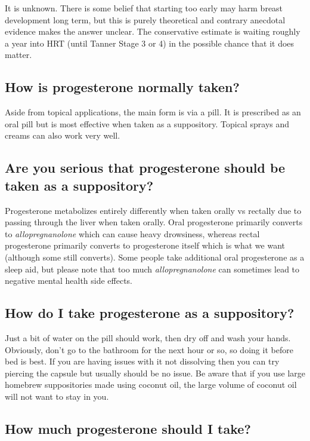 \documentclass{article}
\begin{document}
It is unknown. There is some belief that starting too early may harm breast development long term, but this is purely theoretical and contrary anecdotal evidence makes the answer unclear. The conservative estimate is waiting roughly a year into HRT (until Tanner Stage 3 or 4) in the possible chance that it does matter.

\subsection{How is progesterone normally taken?}

Aside from topical applications, the main form is via a pill. It is prescribed as an oral pill but is most effective when taken as a suppository. Topical sprays and creams can also work very well.

\subsection{Are you serious that progesterone should be taken as a suppository?}

Progesterone metabolizes entirely differently when taken orally vs rectally due to passing through the liver when taken orally. Oral progesterone primarily converts to \textit{allopregnanolone} which can cause heavy drowsiness, whereas rectal progesterone primarily converts to progesterone itself which is what we want (although some still converts). Some people take additional oral progesterone as a sleep aid, but please note that too much \textit{allopregnanolone} can sometimes lead to negative mental health side effects.

\subsection{How do I take progesterone as a suppository?}

Just a bit of water on the pill should work, then dry off and wash your hands. Obviously, don’t go to the bathroom for the next hour or so, so doing it before bed is best. If you are having issues with it not dissolving then you can try piercing the capsule but usually should be no issue. Be aware that if you use large homebrew suppositories made using coconut oil, the large volume of coconut oil will not want to stay in you.

\subsection{How much progesterone should I take?}
\end{document}
